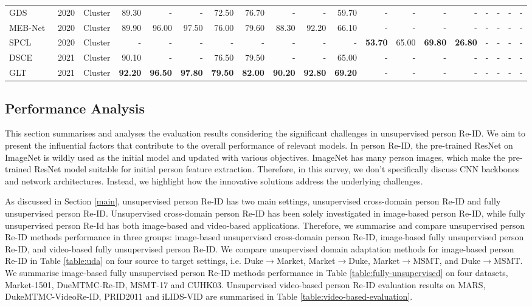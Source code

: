 \documentclass[a4paper,fleqn]{cas-dc}
\begin{document}
\begin{table} [t]
{\begin{tabular}{l|l|l|rrrr|rrrr|rrrr|rrrr}
GDS~\cite{vedaldi_global_2020}&2020&Cluster&89.30&-&-&72.50&76.70&-&-&59.70&-&-&-&-&-&-&-&-\\
MEB-Net~\cite{vedaldi_multiple_2020}&2020&Cluster&89.90&96.00&97.50&76.00&79.60&88.30&92.20&66.10&-&-&-&-&-&-&-&-\\
SPCL~\cite{ge_self-paced_2020}&2020&Cluster&-&-&-&-&-&-&-&-&{\bf 53.70}&65.00&{\bf 69.80}&{\bf 26.80}&-&-&-&-\\
DSCE\cite{yang_joint_2021}&2021&Cluster&90.10&-&-&76.50&79.50&-&-&65.00&-&-&-&-&-&-&-&-\\
GLT~\cite{zheng_group-aware_2021}&2021&Cluster&{\bf 92.20}&{\bf 96.50}&{\bf 97.80}&{\bf 79.50}&{\bf 82.00}&{\bf 90.20}&{\bf 92.80}&{\bf 69.20}&-&-&-&-&-&-&-&-\\

\bottomrule
\end{tabular}
}
\end{table}
\subsection{Performance Analysis}

This section summarises and analyses the evaluation results considering the significant challenges in unsupervised person Re-ID. We aim to present the influential factors that contribute to the overall performance of relevant models. In person Re-ID, the pre-trained ResNet on ImageNet is wildly used as the initial model and updated with various objectives. ImageNet has many person images, which make the pre-trained ResNet model suitable for initial person feature extraction. Therefore, in this survey, we don't specifically discuss CNN backbones and network architectures. Instead, we highlight how the innovative solutions address the underlying challenges.

As discussed in Section \ref{main}, unsupervised person Re-ID has two main settings, unsupervised cross-domain person Re-ID and fully unsupervised person Re-ID.  Unsupervised cross-domain person Re-ID has been solely investigated in image-based person Re-ID, while fully unsupervised person Re-Id has both image-based and video-based applications. Therefore, we summarise and compare unsupervised person Re-ID methods performance in three groups: image-based unsupervised cross-domain person Re-ID, image-based fully unsupervised person Re-ID, and video-based fully unsupervised person Re-ID. We compare unsupervised domain adaptation methods for image-based person Re-ID in Table \ref{table:uda} on four source to target settings, i.e. Duke$\rightarrow$Market, Market$\rightarrow$Duke, Market$\rightarrow$MSMT, and Duke$\rightarrow$MSMT. We summarise image-based fully unsupervised person Re-ID methods performance in Table \ref{table:fully-unsupervised} on four datasets, Market-1501, DueMTMC-Re-ID, MSMT-17 and CUHK03. Unsupervised video-based person Re-ID evaluation results on MARS, DukeMTMC-VideoRe-ID, PRID2011 and iLIDS-VID are summarised in Table \ref{table:video-based-evaluation}.
\end{document}
